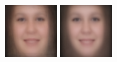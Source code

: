 \documentclass[10pt,twocolumn,letterpaper]{article}
\begin{document}
\begin {figure} [h]
    \centering
    \begin {minipage}{0.22\textwidth}
        \includegraphics[width = \linewidth]{mean_0.png}
    \end {minipage}
    \begin {minipage}{0.22\textwidth}
        \includegraphics[width = \linewidth]{mean_1.png}

\end{minipage}
\end{figure}
\end{document}
